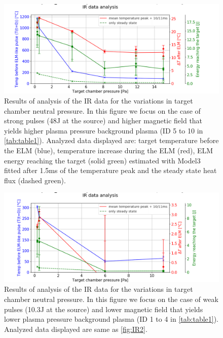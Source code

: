 \begin{figure}[!ht]
	\centering
	\includegraphics[width=0.9\linewidth,trim={35 0 75 22},clip]{Chapters/chapter3/figs/image515_2.png}
	\caption{Results of analysis of the IR data for the variations in target chamber neutral pressure. In this figure we focus on the case of strong pulses (48J at the source) and higher magnetic field that yields higher plasma pressure background plasma (ID 5 to 10 in \autoref{tab:table1}). Analyzed data displayed are: target temperature before the ELM (blue), temperature increase during the ELM (red), ELM energy reaching the target (solid green) estimated with Model3 fitted after 1.5ms of the temperature peak and the steady state heat flux (dashed green).}
	\label{fig:IR2}
\end{figure}
\begin{figure}[!ht]
	\centering
	\includegraphics[width=0.9\linewidth,trim={35 0 80 30},clip]{Chapters/chapter3/figs/image516_2.png}
	\caption{Results of analysis of the IR data for the variations in target chamber neutral pressure. In this figure we focus on the case of weak pulses (10.3J at the source) and lower magnetic field that yields lower plasma pressure background plasma (ID 1 to 4 in \autoref{tab:table1}). Analyzed data displayed are same as \autoref{fig:IR2}.}
	\label{fig:IR3}
\end{figure}

